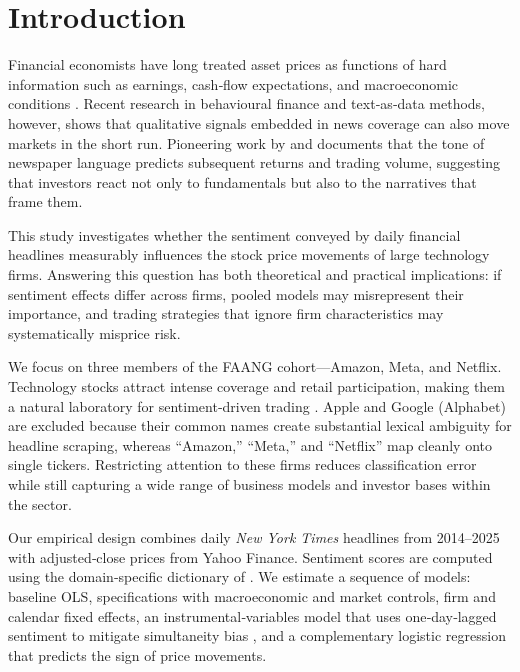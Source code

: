 \documentclass[12pt]{article}
\begin{document}
\newpage
{
\hypersetup{linkcolor=black}
\tableofcontents
\normalsize
\hypersetup{linkcolor=blue}
}

\newpage
\section{Introduction}
\normalsize
\label{sec:introduction}

Financial economists have long treated asset prices as functions of hard information such as earnings, cash‑flow expectations, and macroeconomic conditions \citep{fama1990}.  Recent research in behavioural finance and text‑as‑data methods, however, shows that qualitative signals embedded in news coverage can also move markets in the short run.  Pioneering work by \citet{tetlock2007giving} and \citet{loughran2011} documents that the tone of newspaper language predicts subsequent returns and trading volume, suggesting that investors react not only to fundamentals but also to the narratives that frame them.

This study investigates whether the sentiment conveyed by daily financial headlines measurably influences the stock price movements of large technology firms. Answering this question has both theoretical and practical implications: if sentiment effects differ across firms, pooled models may misrepresent their importance, and trading strategies that ignore firm characteristics may systematically misprice risk.

We focus on three members of the FAANG cohort—Amazon, Meta, and Netflix.  Technology stocks attract intense coverage and retail participation, making them a natural laboratory for sentiment‑driven trading \citep{cristescu2023wavelet}.  Apple and Google (Alphabet) are excluded because their common names create substantial lexical ambiguity for headline scraping, whereas “Amazon,” “Meta,” and “Netflix” map cleanly onto single tickers.  Restricting attention to these firms reduces classification error while still capturing a wide range of business models and investor bases within the sector.

Our empirical design combines daily \textit{New York Times} headlines from 2014–2025 with adjusted‑close prices from Yahoo Finance.  Sentiment scores are computed using the domain‑specific dictionary of \citet{loughran2011}.  We estimate a sequence of models: baseline OLS, specifications with macroeconomic and market controls, firm and calendar fixed effects, an instrumental‑variables model that uses one‑day‑lagged sentiment to mitigate simultaneity bias \citep{tetlock2007giving}, and a complementary logistic regression that predicts the sign of price movements.
\end{document}
